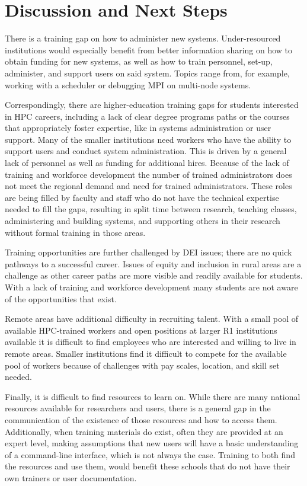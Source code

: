 \documentclass[sigconf]{acmart}
\theoremstyle{plain}
\begin{document}
\section{Discussion and Next Steps}

There is a training gap on how to administer new systems.
Under-resourced institutions would especially benefit from better
information sharing on how to obtain funding for new systems, as well
as how to train personnel, set-up, administer, and support users on
said system. Topics range from, for example, working with a scheduler
or debugging MPI on multi-node systems. 

Correspondingly, there are higher-education training gaps for students
interested in HPC careers, including a lack of clear degree programs
paths or the courses that appropriately foster expertise, like in
systems administration or user support.  Many of the smaller
institutions need workers who have the ability to support users and
conduct system administration. This is driven by a general lack of
personnel as well as funding for additional hires.  Because of the
lack of training and workforce development the number of trained
administrators does not meet the regional demand and need for trained
administrators. These roles are being filled by faculty and staff who
do not have the technical expertise needed to fill the gaps, resulting
in split time between research, teaching classes, administering and
building systems, and supporting others in their research without
formal training in those areas. 

Training opportunities are further challenged by DEI issues; there are
no quick pathways to a successful career. Issues of equity and
inclusion in rural areas are a challenge as other career paths are more
visible and readily available for students. With a lack of training
and workforce development many students are not aware of the
opportunities that exist. 

Remote areas have additional difficulty in recruiting talent.  With a
small pool of available HPC-trained workers and open positions at
larger R1 institutions available it is difficult to find employees who
are interested and willing to live in remote areas. Smaller
institutions find it difficult to compete for the available pool of
workers because of challenges with pay scales, location, and skill set
needed. 

Finally, it is difficult to find resources to learn on.  While there
are many national resources available for researchers and users, there
is a general gap in the communication of the existence of those
resources and how to access them. Additionally, when training
materials do exist, often they are provided at an expert level, making
assumptions that new users will have a basic understanding
of a command-line interface, which is not always the case.  Training
to both find the resources and use them, would benefit these 
schools that do not have their own trainers or user documentation.
\end{document}
